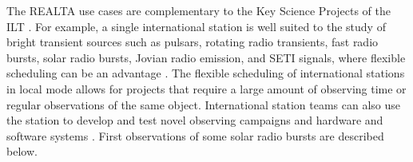 The REALTA use cases are complementary to the Key Science Projects of the ILT \citep[KSP; see][]{VanHaarlem2013}. For example, a single international station is well suited to the study of bright transient sources such as pulsars, rotating radio transients, fast radio bursts, solar radio bursts, Jovian radio emission, and SETI signals, where flexible scheduling can be an advantage \citep[for example,][]{Maguire2020, Morosan2019}. The flexible scheduling of international stations in local mode allows for projects that require a large amount of observing time or regular observations of the same object. International station teams can also use the station to develop and test novel observing campaigns and hardware and software systems \citep[for example,][]{Scully2021}. First observations of some solar radio bursts are described below.

